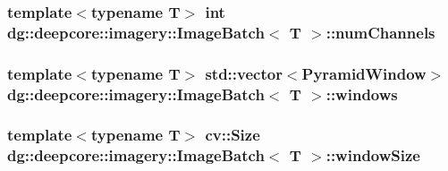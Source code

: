 \subsubsection[{\texorpdfstring{num\+Channels}{numChannels}}]{\setlength{\rightskip}{0pt plus 5cm}template$<$typename T$>$ int {\bf dg\+::deepcore\+::imagery\+::\+Image\+Batch}$<$ T $>$\+::num\+Channels}\hypertarget{structdg_1_1deepcore_1_1imagery_1_1_image_batch_a80cbef4587861d99294c5ca3ee0e7aec}{}\label{structdg_1_1deepcore_1_1imagery_1_1_image_batch_a80cbef4587861d99294c5ca3ee0e7aec}
\subsubsection[{\texorpdfstring{windows}{windows}}]{\setlength{\rightskip}{0pt plus 5cm}template$<$typename T$>$ std\+::vector$<${\bf Pyramid\+Window}$>$ {\bf dg\+::deepcore\+::imagery\+::\+Image\+Batch}$<$ T $>$\+::windows}\hypertarget{structdg_1_1deepcore_1_1imagery_1_1_image_batch_aaad6b20c2ef1174aa8f76316de2f3346}{}\label{structdg_1_1deepcore_1_1imagery_1_1_image_batch_aaad6b20c2ef1174aa8f76316de2f3346}
\subsubsection[{\texorpdfstring{window\+Size}{windowSize}}]{\setlength{\rightskip}{0pt plus 5cm}template$<$typename T$>$ cv\+::\+Size {\bf dg\+::deepcore\+::imagery\+::\+Image\+Batch}$<$ T $>$\+::window\+Size}\hypertarget{structdg_1_1deepcore_1_1imagery_1_1_image_batch_a7aa70055515ba469802a87e84a55b126}{}\label{structdg_1_1deepcore_1_1imagery_1_1_image_batch_a7aa70055515ba469802a87e84a55b126}

